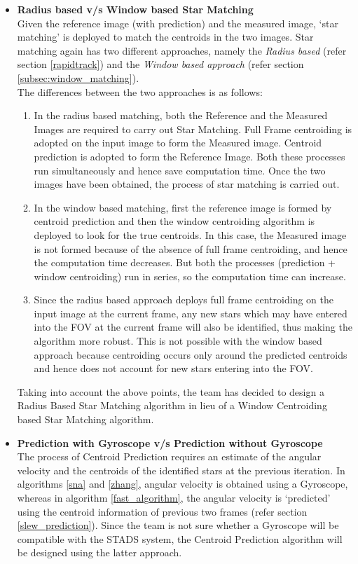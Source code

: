 \documentclass[../../main.tex]{subfiles}
\begin{document}
\begin{itemize}
    \item \textbf{Radius based v/s Window based Star Matching}\\
    Given the reference image (with prediction) and the measured image, `star matching' is deployed to match the centroids in the two images. Star matching again has two different approaches, namely the \emph{Radius based} (refer section \ref{rapidtrack}) and the \emph{Window based approach} (refer section \ref{subsec:window_matching}). \\
    The differences between the two approaches is as follows: 
    \begin{enumerate}
        \item In the radius based matching, both the Reference and the Measured Images are required to carry out Star Matching. Full Frame centroiding is adopted on the input image to form the Measured image. Centroid prediction is adopted to form the Reference Image. Both these processes run simultaneously and hence save computation time. Once the two images have been obtained, the process of star matching is carried out. 
        \item In the window based matching, first the reference image is formed by centroid prediction and then the window centroiding algorithm is deployed to look for the true centroids. In this case, the Measured image is not formed because of the absence of full frame centroiding, and hence the computation time decreases. But both the processes (prediction + window centroiding) run in series, so the computation time can increase.
        \item Since the radius based approach deploys full frame centroiding on the input image at the current frame, any new stars which may have entered into the FOV at the current frame will also be identified, thus making the algorithm more robust. This is not possible with the window based approach because centroiding occurs only around the predicted centroids and hence does not account for new stars entering into the FOV. 
    \end{enumerate}
    Taking into account the above points, the team has decided to design a Radius Based Star Matching algorithm in lieu of a Window Centroiding based Star Matching algorithm. 
    
    \item \textbf{Prediction with Gyroscope v/s Prediction without Gyroscope}\\
    The process of Centroid Prediction requires an estimate of the angular velocity and the centroids of the identified stars at the previous iteration. In algorithms \ref{sna} and \ref{zhang}, angular velocity is obtained using a Gyroscope, whereas in algorithm \ref{fast_algorithm}, the angular velocity is `predicted' using the centroid information of previous two frames (refer section \ref{slew_prediction}). Since the team is not sure whether a Gyroscope will be compatible with the STADS system, the Centroid Prediction algorithm will be designed using the latter approach. 
\end{itemize} 
\end{document}
